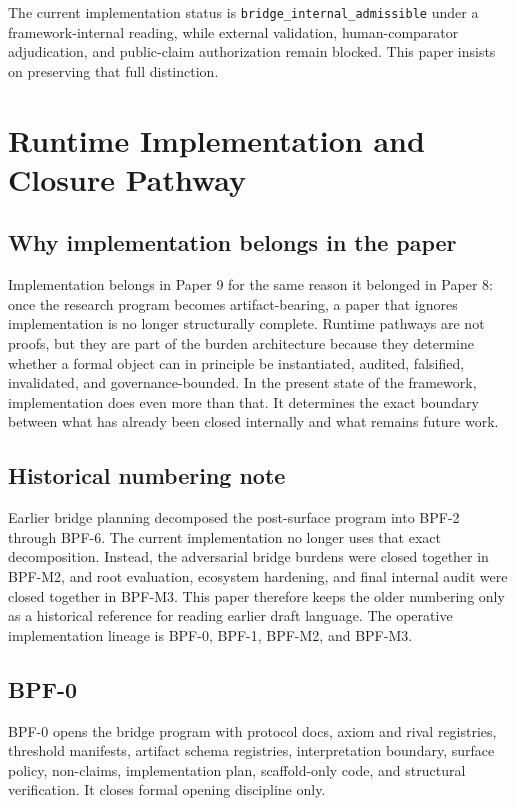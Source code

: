 \documentclass[11pt,a4paper]{article}
\theoremstyle{definition}
\begin{document}
The current implementation status is \texttt{bridge\_internal\_admissible} under a framework-internal reading, while external validation, human-comparator adjudication, and public-claim authorization remain blocked. This paper insists on preserving that full distinction.

\section{Runtime Implementation and Closure Pathway}
\subsection{Why implementation belongs in the paper}
Implementation belongs in Paper 9 for the same reason it belonged in Paper 8: once the research program becomes artifact-bearing, a paper that ignores implementation is no longer structurally complete. Runtime pathways are not proofs, but they are part of the burden architecture because they determine whether a formal object can in principle be instantiated, audited, falsified, invalidated, and governance-bounded. In the present state of the framework, implementation does even more than that. It determines the exact boundary between what has already been closed internally and what remains future work.

\subsection{Historical numbering note}
Earlier bridge planning decomposed the post-surface program into BPF-2 through BPF-6. The current implementation no longer uses that exact decomposition. Instead, the adversarial bridge burdens were closed together in BPF-M2, and root evaluation, ecosystem hardening, and final internal audit were closed together in BPF-M3. This paper therefore keeps the older numbering only as a historical reference for reading earlier draft language. The operative implementation lineage is BPF-0, BPF-1, BPF-M2, and BPF-M3.

\subsection{BPF-0}
BPF-0 opens the bridge program with protocol docs, axiom and rival registries, threshold manifests, artifact schema registries, interpretation boundary, surface policy, non-claims, implementation plan, scaffold-only code, and structural verification. It closes formal opening discipline only.
\end{document}
